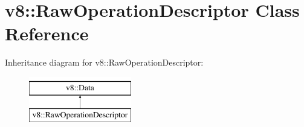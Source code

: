 \hypertarget{classv8_1_1RawOperationDescriptor}{\section{v8\-:\-:Raw\-Operation\-Descriptor Class Reference}
\label{classv8_1_1RawOperationDescriptor}
}
Inheritance diagram for v8\-:\-:Raw\-Operation\-Descriptor\-:\begin{figure}[H]
\begin{center}
\leavevmode
\includegraphics[height=2.000000cm]{classv8_1_1RawOperationDescriptor}
\end{center}
\end{figure}
